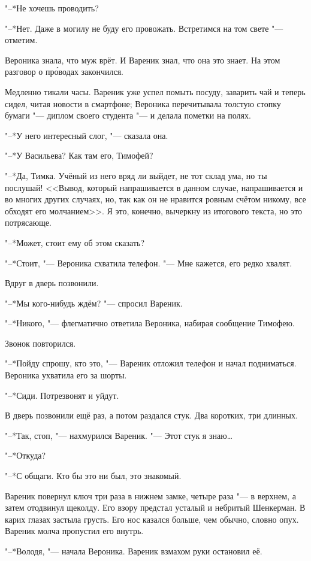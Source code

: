 "--*Не хочешь проводить?

"--*Нет.
Даже в могилу не буду его провожать.
Встретимся на том свете "--- отметим.

Вероника знала, что муж врёт.
И Вареник знал, что она это знает.
На этом разговор о пр\'оводах закончился.

Медленно тикали часы.
Вареник уже успел помыть посуду, заварить чай и теперь сидел, читая новости в смартфоне;
Вероника перечитывала толстую стопку бумаги "--- диплом своего студента "--- и делала пометки на полях.

"--*У него интересный слог, "--- сказала она.

"--*У Васильева?
Как там его, Тимофей?

"--*Да, Тимка.
Учёный из него вряд ли выйдет, не тот склад ума, но ты послушай!
<<Вывод, который напрашивается в данном случае, напрашивается и во многих других случаях, но, так как он не нравится ровным счётом никому, все обходят его молчанием>>.
Я это, конечно, вычеркну из итогового текста, но это потрясающе.

"--*Может, стоит ему об этом сказать?

"--*Стоит, "--- Вероника схватила телефон.
"--- Мне кажется, его редко хвалят.

Вдруг в дверь позвонили.

"--*Мы кого-нибудь ждём? "--- спросил Вареник.

"--*Никого, "--- флегматично ответила Вероника, набирая сообщение Тимофею.

Звонок повторился.

"--*Пойду спрошу, кто это, "--- Вареник отложил телефон и начал подниматься.
Вероника ухватила его за шорты.

"--*Сиди.
Потрезвонят и уйдут.

В дверь позвонили ещё раз, а потом раздался стук.
Два коротких, три длинных.

"--*Так, стоп, "--- нахмурился Вареник.
"--- Этот стук я знаю\dots{}

"--*Откуда?

"--*С общаги.
Кто бы это ни был, это знакомый.

Вареник повернул ключ три раза в нижнем замке, четыре раза "--- в верхнем, а затем отодвинул щеколду.
Его взору предстал усталый и небритый Шенкерман.
В карих глазах застыла грусть.
Его нос казался больше, чем обычно, словно опух.
Вареник молча пропустил его внутрь.

"--*Володя, "--- начала Вероника.
Вареник взмахом руки остановил её.

